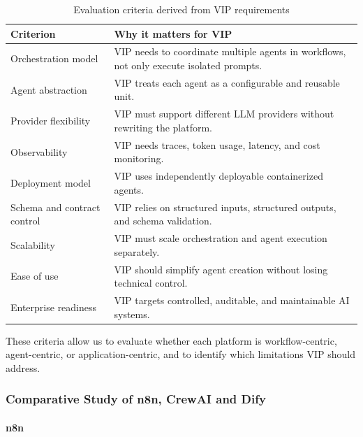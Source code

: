 \begin{table}[H]
\centering
\renewcommand{\arraystretch}{1.25}
\caption{Evaluation criteria derived from VIP requirements}
\label{tab:vip_evaluation_criteria}
\begin{tabularx}{\textwidth}{|
    >{\raggedright\arraybackslash}p{}|
    >{\raggedright\arraybackslash}X|}
\hline
\rowcolor{gray!15}
\textbf{Criterion} & \textbf{Why it matters for VIP} \\
\hline
Orchestration model & VIP needs to coordinate multiple agents in workflows, not only execute isolated prompts. \\
\hline
Agent abstraction & VIP treats each agent as a configurable and reusable unit. \\
\hline
Provider flexibility & VIP must support different LLM providers without rewriting the platform. \\
\hline
Observability & VIP needs traces, token usage, latency, and cost monitoring. \\
\hline
Deployment model & VIP uses independently deployable containerized agents. \\
\hline
Schema and contract control & VIP relies on structured inputs, structured outputs, and schema validation. \\
\hline
Scalability & VIP must scale orchestration and agent execution separately. \\
\hline
Ease of use & VIP should simplify agent creation without losing technical control. \\
\hline
Enterprise readiness & VIP targets controlled, auditable, and maintainable AI systems. \\
\hline
\end{tabularx}
\end{table}

These criteria allow us to evaluate whether each platform is workflow-centric, agent-centric, or application-centric, and to identify which limitations VIP should address.

\subsubsection{Comparative Study of n8n, CrewAI and Dify}

\setcounter{secnumdepth}{4}
\setcounter{tocdepth}{4}

\paragraph{n8n}

